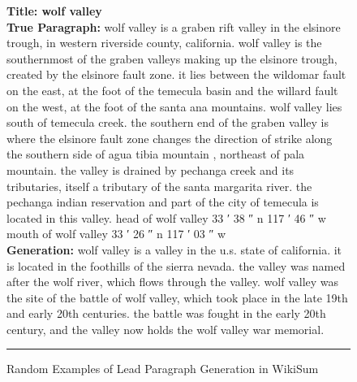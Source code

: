 \documentclass[11pt,a4paper]{article}
\begin{document}
\begin{figure*}[t]
    \vspace{2mm} \textbf{Title: wolf valley} \\
    
    \textbf{True Paragraph:} wolf valley is a graben rift valley in the elsinore trough, in western riverside county, california. wolf valley is the southernmost of the graben valleys making up the elsinore trough, created by the elsinore fault zone. it lies between the wildomar fault on the east, at the foot of the temecula basin and the willard fault on the west, at the foot of the santa ana mountains. wolf valley lies south of temecula creek. the southern end of the graben valley is where the elsinore fault zone changes the direction of strike along the southern side of agua tibia mountain , northeast of pala mountain. the valley is drained by pechanga creek and its tributaries, itself a tributary of the santa margarita river. the pechanga indian reservation and part of the city of temecula is located in this valley. head of wolf valley 33  ′ 38 ″ n 117  ′ 46 ″ w mouth of wolf valley 33  ′ 26 ″ n 117  ′ 03 ″ w\\
    
    \textbf{Generation:} wolf valley is a valley in the u.s. state of california. it is located in the foothills of the sierra nevada. the valley was named after the wolf river, which flows through the valley. wolf valley was the site of the battle of wolf valley, which took place in the late 19th and early 20th centuries. the battle was fought in the early 20th century, and the valley now holds the wolf valley war memorial.\\
  \rule{\linewidth}{1pt}
  \caption{Random Examples of Lead Paragraph Generation in WikiSum}
  \label{fig:examples_wikisum_generation}
\end{figure*} 
\end{document}
